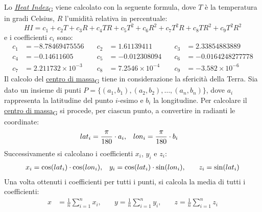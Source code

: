 Lo \href{https://7last.github.io/docs/pb/documentazione-interna/glossario\#heat-index}{\textit{Heat Index}\textsubscript{G}} viene calcolato con la seguente formula, dove $T$ è la temperatura in gradi Celsius, $R$ l'umidità relativa in percentuale:
\[
	HI = c_1 + c_2 T + c_3 R + c_4 TR + c_5 T^2 + c_6 R^2 + c_7 T^2 R + c_8 TR^2 + c_9 T^2 R^2
\]
e i coefficienti $c_i$ sono:
\begin{align*}
	c_1 & = -8.78469475556          & \quad c_2 & = 1.61139411            & \quad c_3 & = 2.33854883889         \\
	c_4 & = -0.14611605             & \quad c_5 & = -0.012308094          & \quad c_6 & = -0.0164248277778      \\
	c_7 & = 2.211732 \times 10^{-3} & \quad c_8 & = 7.2546 \times 10^{-4} & \quad c_9 & = -3.582 \times 10^{-6}
\end{align*}
Il calcolo del \href{https://7last.github.io/docs/pb/documentazione-interna/glossario\#centro-di-massa}{centro di massa\textsubscript{G}} tiene in considerazione la sfericità della Terra. Sia dato un insieme di punti $P = \{(a_1, b_1), (a_2, b_2), \ldots, (a_n, b_n)\}$, dove $a_i$ rappresenta
la latitudine del punto $i$-esimo e $b_i$ la longitudine. Per calcolare il \href{https://7last.github.io/docs/pb/documentazione-interna/glossario\#centro-di-massa}{centro di massa\textsubscript{G}} si procede, per ciascun punto, a convertire in radianti le coordinate:
\begin{align*}
	{lat}_i = \frac{\pi}{180} \cdot a_i, & \quad {lon}_i = \frac{\pi}{180} \cdot b_i
\end{align*}
Successivamente si calcolano i coefficienti $x_i$, $y_i$ e $z_i$:
\begin{align*}
	x_i = \cos({lat}_i) \cdot \cos({lon}_i),       &
	\quad y_i = \cos({lat}_i) \cdot \sin({lon}_i), &
	\quad z_i = \sin({lat}_i)
\end{align*}
Una volta ottenuti i coefficienti per tutti i punti, si calcola la media di tutti i coefficienti:
\begin{align*}
	x & = \frac{1}{n} \sum_{i=1}^{n} x_i, & \quad y = \frac{1}{n} \sum_{i=1}^{n} y_i, & \quad z = \frac{1}{n} \sum_{i=1}^{n} z_i
\end{align*}

